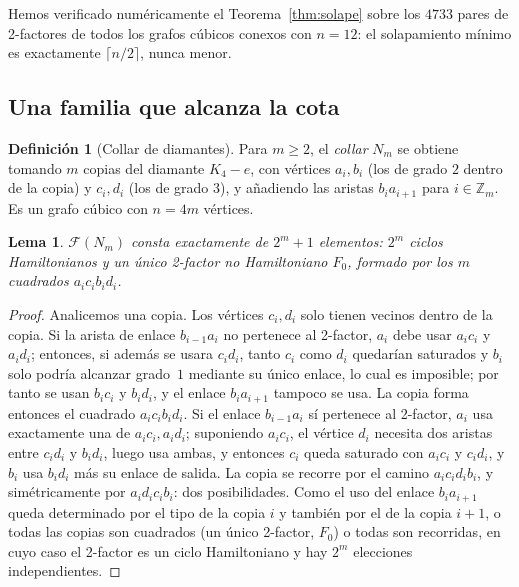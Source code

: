 \documentclass[11pt,a4paper]{article}
\newtheorem{lema}[teorema]{Lema}
\theoremstyle{definition}
\newtheorem{definicion}[teorema]{Definición}
\theoremstyle{remark}
\begin{document}
Hemos verificado numéricamente el Teorema~\ref{thm:solape} sobre los $4733$ pares de 2-factores de todos los grafos cúbicos conexos con $n=12$: el solapamiento mínimo es exactamente $\lceil n/2\rceil$, nunca menor.

\subsection{Una familia que alcanza la cota}

\begin{definicion}[Collar de diamantes]
Para $m\ge2$, el \emph{collar} $N_m$ se obtiene tomando $m$ copias del diamante $K_4-e$, con vértices $a_i,b_i$ (los de grado $2$ dentro de la copia) y $c_i,d_i$ (los de grado $3$), y añadiendo las aristas $b_ia_{i+1}$ para $i\in\mathbb{Z}_m$. Es un grafo cúbico con $n=4m$ vértices.
\end{definicion}

\begin{lema}\label{lem:collar}
$\mathcal{F}(N_m)$ consta exactamente de $2^m+1$ elementos: $2^m$ ciclos Hamiltonianos y un único 2-factor no Hamiltoniano $F_0$, formado por los $m$ cuadrados $a_ic_ib_id_i$.
\end{lema}

\begin{proof}
Analicemos una copia. Los vértices $c_i,d_i$ solo tienen vecinos dentro de la copia. Si la arista de enlace $b_{i-1}a_i$ no pertenece al 2-factor, $a_i$ debe usar $a_ic_i$ y $a_id_i$; entonces, si además se usara $c_id_i$, tanto $c_i$ como $d_i$ quedarían saturados y $b_i$ solo podría alcanzar grado~$1$ mediante su único enlace, lo cual es imposible; por tanto se usan $b_ic_i$ y $b_id_i$, y el enlace $b_ia_{i+1}$ tampoco se usa. La copia forma entonces el cuadrado $a_ic_ib_id_i$.
Si el enlace $b_{i-1}a_i$ sí pertenece al 2-factor, $a_i$ usa exactamente una de $a_ic_i,a_id_i$; suponiendo $a_ic_i$, el vértice $d_i$ necesita dos aristas entre $c_id_i$ y $b_id_i$, luego usa ambas, y entonces $c_i$ queda saturado con $a_ic_i$ y $c_id_i$, y $b_i$ usa $b_id_i$ más su enlace de salida. La copia se recorre por el camino $a_i c_i d_i b_i$, y simétricamente por $a_i d_i c_i b_i$: dos posibilidades.
Como el uso del enlace $b_ia_{i+1}$ queda determinado por el tipo de la copia $i$ y también por el de la copia $i+1$, o todas las copias son cuadrados (un único 2-factor, $F_0$) o todas son recorridas, en cuyo caso el 2-factor es un ciclo Hamiltoniano y hay $2^m$ elecciones independientes.
\end{proof}
\end{document}
